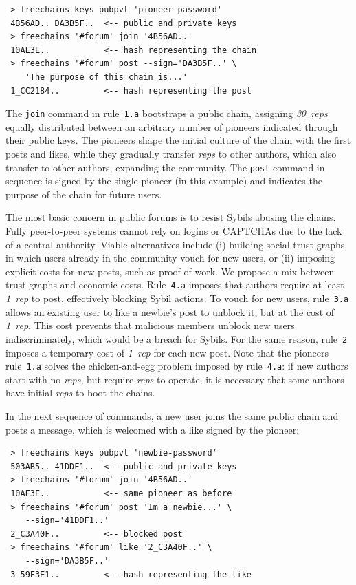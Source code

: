 \documentclass[12pt]{article}
\newcommand{\reps}     {\emph{reps}\xspace}
\newcommand{\onerep}   {\emph{1~rep}\xspace}
\newcommand{\nreps}[1] {\emph{#1~reps\xspace}}
\newcommand{\code}[1]  {\texttt{\footnotesize{#1}}}
\begin{document}
{\footnotesize
\begin{verbatim}
 > freechains keys pubpvt 'pioneer-password'
 4B56AD.. DA3B5F..  <-- public and private keys
 > freechains '#forum' join '4B56AD..'
 10AE3E..           <-- hash representing the chain
 > freechains '#forum' post --sign='DA3B5F..' \
    'The purpose of this chain is...'
 1_CC2184..         <-- hash representing the post
\end{verbatim}
}

The \code{join} command in rule~\code{1.a} bootstraps a public chain,
assigning \nreps{30} equally distributed between an arbitrary number of
pioneers indicated through their public keys.
The pioneers shape the initial culture of the chain with the first posts and
likes, while they gradually transfer \reps to other authors, which also
transfer to other authors, expanding the community.
%
The \code{post} command in sequence is signed by the single pioneer (in this
example) and indicates the purpose of the chain for future users.

The most basic concern in public forums is to resist Sybils abusing the
chains.
Fully peer-to-peer systems cannot rely on logins or {\footnotesize CAPTCHAs}
due to the lack of a central authority.
Viable alternatives include (i) building social trust graphs, in which users
already in the community vouch for new users, or (ii) imposing explicit costs
for new posts, such as proof of work.
%
We propose a mix between trust graphs and economic costs.
%
Rule~\code{4.a} imposes that authors require at least \onerep to post,
effectively blocking Sybil actions.
To vouch for new users, rule~\code{3.a} allows an existing user to like a
newbie's post to unblock it, but at the cost of \onerep.
This cost prevents that malicious members unblock new users indiscriminately,
which would be a breach for Sybils.
For the same reason, rule~\code{2} imposes a temporary cost of \onerep for
each new post.
%
Note that the pioneers rule~\code{1.a} solves the chicken-and-egg problem
imposed by rule~\code{4.a}: if new authors start with no \reps, but require
\reps to operate, it is necessary that some authors have initial \reps to boot
the chains.

In the next sequence of commands, a new user joins the same public chain and
posts a message, which is welcomed with a like signed by the pioneer:

{\footnotesize
\begin{verbatim}
 > freechains keys pubpvt 'newbie-password'
 503AB5.. 41DDF1..  <-- public and private keys
 > freechains '#forum' join '4B56AD..'
 10AE3E..           <-- same pioneer as before
 > freechains '#forum' post 'Im a newbie...' \
    --sign='41DDF1..'
 2_C3A40F..         <-- blocked post
 > freechains '#forum' like '2_C3A40F..' \
    --sign='DA3B5F..'
 3_59F3E1..         <-- hash representing the like
\end{verbatim}
}
\end{document}
